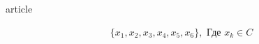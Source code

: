 article

\usepackage{amsmath,amsthm,amssymb}
\usepackage{mathtext}
\usepackage[T1,T2A]{fontenc}
\usepackage[utf8]{inputenc}
\usepackage[english,bulgarian,ukrainian,russian]{babel}


\begin{align*}
\{x_1, x_2, x_3, x_4, x_5, x_6\}, \text{ Где } x_k \in C
\end{align*}
